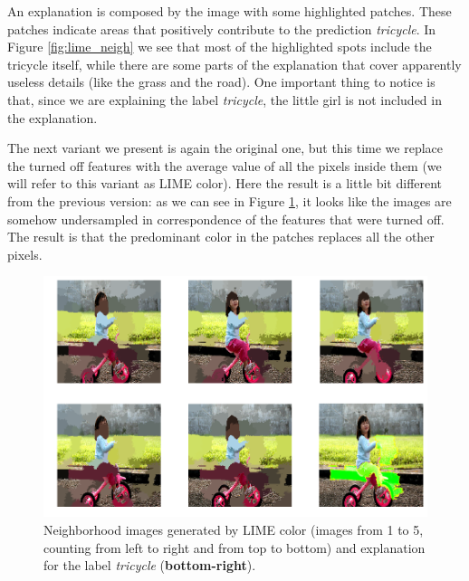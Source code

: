 \documentclass[12pt, twoside, a4paper]{report}
\begin{document}
An explanation is composed by the image with some highlighted patches. These patches indicate areas that positively contribute to the prediction \emph{tricycle}. In Figure \ref{fig:lime_neigh} we see that most of the highlighted spots include the tricycle itself, while there are some parts of the explanation that cover apparently useless details (like the grass and the road). 
One important thing to notice is that, since we are explaining the label \emph{tricycle}, the little girl is not included in the explanation.


\bigskip

The next variant we present is again the original one, but this time we replace the turned off features with the average value of all the pixels inside them (we will refer to this variant as LIME color). Here the result is a little bit different from the previous version: as we can see in Figure \ref{fig:limecolor_neigh}, it looks like the images are somehow undersampled in correspondence of the features that were turned off. The result is that the predominant color in the patches replaces all the other pixels.

\begin{figure}
\begin{center}
\includegraphics[width = .85\textwidth]{images/limecolor_neighborhood.png} 
\caption{Neighborhood images generated by LIME color (images from 1 to 5, counting from left to right and from top to bottom) and explanation for the label \textit{tricycle} (\textbf{bottom-right}).}
\label{fig:limecolor_neigh}
\end{center}
\end{figure}
\end{document}
